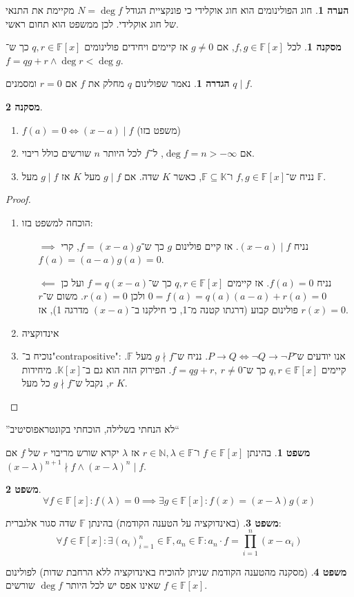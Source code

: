 \documentclass[a4paper]{article}
\newcommand\N     {\mathbb{N}}
\newcommand\K     {\mathbb{K}}
\renewcommand\inf {\infty}
\newcommand\F         {\mathbb{F}}
\newcommand\co        {\colon}
\newcommand\ag        {\alpha}
\renewcommand\lg      {\lambda}
\theoremstyle{definition}
\newtheorem{Theorem}{\color{myblue}משפט}
\newtheorem{Definition}{\color{mygreen}הגדרה}
\newtheorem{Remark}{\color{mycyan}הערה}
\newtheorem{Collary}{\color{mymagenta}מסקנה}
\newcommand\cola [1] {\begin{Collary}#1\end{Collary}}
\newcommand\theo  [1] {\begin{Theorem}#1\end{Theorem}}
\newcommand\defi  [1] {\begin{Definition}#1\end{Definition}}
\newcommand\rmark [1] {\begin{Remark}#1\end{Remark}}
\begin{document}
	\rmark{חוג הפולינומים הוא חוג אוקלידי כי פונקציית הגודל $N = \deg f$ מקיימת את התנאי של חוג אוקלידי. לכן ממשפט הוא תחום ראשי. }
	\cola{לכל $f, g \in \F[x]$, אם $g \neq 0$ אז קיימים ויחידים פולינומים $q, r \in \F[x]$ כך ש־$f = qg + r \land \deg r < \deg g$. }
	
	\defi{נאמר שפולינום $q$ מחלק את $f$ אם $r = 0$ ומסמנים $q \mid f$. }
	
	\cola{\,
		\begin{enumerate}
			\item $f(a) = 0 \iff (x - a) \mid f$ (משפט בזו)
			\item אם $\deg f = n > -\inf$, ל־$f$ לכל היותר $n$ שורשים כולל ריבוי. 
			\item נניח ש־$f, g \in \F[x]$ ו־$\F \subseteq \K$, כאשר $K$ שדה. אם $g \mid f$ מעל $K$ אז $g \mid f$ מעל $\F$. 
		\end{enumerate}
	}
	\begin{proof}\,
		\begin{enumerate}
			\item הוכחה למשפט בזו: 
			\begin{itemize}
				\item[$\implies$] נניח $(x - a) \mid f$. אז קיים פולינום $g$ כך ש־$f = (x - a)g$, קרי $f(a) = (a - a)g(a) = 0$. 
				\item[$\impliedby$] נניח $f(a) = 0$. אז קיימים $q, r \in \F[x]$ כך ש־$f = q(x - a)$ ועל כן $0 = f(a) = q(a)(a - a) + r(a) = 0$ ולכן $r(a) = 0$. משום ש־$r$ פולינום קבוע (דרגתו קטנה מ־1, כי חילקנו ב־$(x - a)$ מדרגה 1), אז $r(x) = 0$. 
			\end{itemize}
			\item אינדוקציה
			\item נוכיח ב־"contrapositive": אנו יודעים ש־$P \to Q \iff \lnot Q \to \lnot P$. נניח ש־$g \nmid f$ מעל $\F$. קיימים $q, r \in \F[x]$ כך ש־$f =qg + r, \ r \neq 0$. הפירוק הזה הוא גם ב־$\K[x]$. מיחידות $r$, נקבל ש־$g \nmid f$ כל מעל $K$. 
		\end{enumerate}
	\end{proof}
	''לא הנחתי בשלילה, הוכחתי בקונטראפוסיטיב``
	
	\theo{בהינתן $f \in \F[x]$ ו־$r \in \N, \lg \in \F$ אז $\lg$ יקרא שורש מריבוי $r$ של $f$ אם $(x - \lg)^{n + 1} \nmid f \land (x - \lg)^{n} \mid f$. }
	\theo{\[ \forall f\in \F[x] \co f(\lg) = 0 \implies \exists g \in \F[x] \co f(x) = (x - \lg)g(x) \]}
	\theo{(באינדוקציה על הטענה הקודמת) בהינתן $\F$ שדה סגור אלגברית: 
		\[ \forall f \in \F[x] \co \exists (\ag_i)_{i = 1}^{n} \in \F, a_n \in \F \co a_n \cdot f = \prod_{i = 1}^{n}(x - \ag_i) \]}
	\theo{(מסקנה מהטענה הקודמת שניתן להוכיח באינדוקציה ללא הרחבת שדות) לפולינום $f \in \F[x]$ שאינו אפס יש לכל היותר $\deg f$ שורשים. }
	
\end{document}
